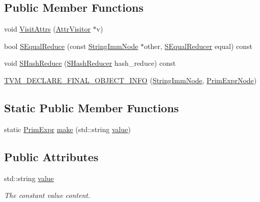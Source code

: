 \subsection*{Public Member Functions}
\begin{DoxyCompactItemize}
\item 
void \hyperlink{classtvm_1_1tir_1_1StringImmNode_ac01ffc8ae6ef913d1fbc34fb7f23847c}{Visit\+Attrs} (\hyperlink{classtvm_1_1AttrVisitor}{Attr\+Visitor} $\ast$v)
\item 
bool \hyperlink{classtvm_1_1tir_1_1StringImmNode_a1838338eb7520d37a2a779358521287b}{S\+Equal\+Reduce} (const \hyperlink{classtvm_1_1tir_1_1StringImmNode}{String\+Imm\+Node} $\ast$other, \hyperlink{classtvm_1_1SEqualReducer}{S\+Equal\+Reducer} equal) const 
\item 
void \hyperlink{classtvm_1_1tir_1_1StringImmNode_a9ad186c7d5805d8af02b5d06450051c6}{S\+Hash\+Reduce} (\hyperlink{classtvm_1_1SHashReducer}{S\+Hash\+Reducer} hash\+\_\+reduce) const 
\item 
\hyperlink{classtvm_1_1tir_1_1StringImmNode_a99c1ae09343d2a751523871480eba905}{T\+V\+M\+\_\+\+D\+E\+C\+L\+A\+R\+E\+\_\+\+F\+I\+N\+A\+L\+\_\+\+O\+B\+J\+E\+C\+T\+\_\+\+I\+N\+FO} (\hyperlink{classtvm_1_1tir_1_1StringImmNode}{String\+Imm\+Node}, \hyperlink{classtvm_1_1PrimExprNode}{Prim\+Expr\+Node})
\end{DoxyCompactItemize}
\subsection*{Static Public Member Functions}
\begin{DoxyCompactItemize}
\item 
static \hyperlink{classtvm_1_1PrimExpr}{Prim\+Expr} \hyperlink{classtvm_1_1tir_1_1StringImmNode_a96ec2ad3da109844dbaaf45321b7927f}{make} (std\+::string \hyperlink{classtvm_1_1tir_1_1StringImmNode_a08c2e772796d2e2375f3ec6c6b95b4c8}{value})
\end{DoxyCompactItemize}
\subsection*{Public Attributes}
\begin{DoxyCompactItemize}
\item 
std\+::string \hyperlink{classtvm_1_1tir_1_1StringImmNode_a08c2e772796d2e2375f3ec6c6b95b4c8}{value}
\begin{DoxyCompactList}\small\item\em The constant value content. \end{DoxyCompactList}\end{DoxyCompactItemize}
